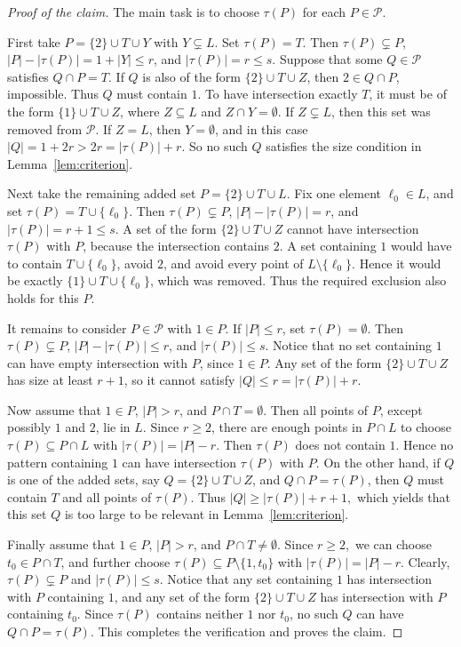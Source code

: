 \documentclass[11pt]{article}
\theoremstyle{definition}
\newenvironment{poc}{\begin{proof}[Proof of the claim]\renewcommand*{\qedsymbol}{$\blacksquare$}}{\end{proof}}
\newcommand{\cP}{\mathcal{P}}
\begin{document}
\begin{poc}
The main task is to choose \(\tau(P)\) for each \(P\in\cP\).

First take \(P=\{2\}\cup T\cup Y\) with \(Y\subsetneq L\). Set \(\tau(P)=T\). Then \(\tau(P)\subsetneq P\), \(|P|-|\tau(P)|=1+|Y|\le r\), and \(|\tau(P)|=r\le s\). Suppose that some \(Q\in\cP\) satisfies \(Q\cap P=T\). If \(Q\) is also of the form \(\{2\}\cup T\cup Z\), then \(2\in Q\cap P\), impossible. Thus \(Q\) must contain \(1\). To have intersection exactly \(T\), it must be of the form \(\{1\}\cup T\cup Z\), where \(Z\subseteq L\) and \(Z\cap Y=\emptyset\). If \(Z\subsetneq L\), then this set was removed from \(\cP\). If \(Z=L\), then \(Y=\emptyset\), and in this case \(|Q|=1+2r>2r=|\tau(P)|+r.\)
So no such \(Q\) satisfies the size condition in Lemma~\ref{lem:criterion}.

Next take the remaining added set \(P=\{2\}\cup T\cup L\). Fix one element \(\ell_0\in L\), and set \(\tau(P)=T\cup\{\ell_0\}\). Then \(\tau(P)\subsetneq P\), \(|P|-|\tau(P)|=r\), and \(|\tau(P)|=r+1\le s\). A set of the form \(\{2\}\cup T\cup Z\) cannot have intersection \(\tau(P)\) with \(P\), because the intersection contains \(2\). A set containing \(1\) would have to contain \(T\cup\{\ell_0\}\), avoid \(2\), and avoid every point of \(L\setminus\{\ell_0\}\). Hence it would be exactly \(\{1\}\cup T\cup\{\ell_0\}\), which was removed. Thus the required exclusion also holds for this \(P\).

It remains to consider \(P\in\cP\) with \(1\in P\). If \(|P|\le r\), set \(\tau(P)=\emptyset\). Then \(\tau(P)\subsetneq P\), \(|P|-|\tau(P)|\le r\), and \(|\tau(P)|\le s\). Notice that no set containing \(1\) can have empty intersection with \(P\), since \(1\in P\). Any set of the form \(\{2\}\cup T\cup Z\) has size at least \(r+1\), so it cannot satisfy \(|Q|\le r=|\tau(P)|+r\).

Now assume that \(1\in P\), \(|P|>r\), and \(P\cap T=\emptyset\). Then all points of \(P\), except possibly \(1\) and \(2\), lie in \(L\). Since \(r\ge2\), there are enough points in \(P\cap L\) to choose
\(\tau(P)\subseteq P\cap L\) with \(|\tau(P)|=|P|-r.\)
Then \(\tau(P)\) does not contain \(1\). Hence no pattern containing \(1\) can have intersection \(\tau(P)\) with \(P\). On the other hand, if \(Q\) is one of the added sets, say \(Q=\{2\}\cup T\cup Z\), and \(Q\cap P=\tau(P)\), then \(Q\) must contain \(T\) and all points of \(\tau(P)\). Thus \(|Q|\ge |\tau(P)|+r+1,\)
which yields that this set \(Q\) is too large to be relevant in Lemma~\ref{lem:criterion}.

Finally assume that \(1\in P\), \(|P|>r\), and \(P\cap T\ne\emptyset\). Since \(r\ge 2,\) we can choose \(t_0\in P\cap T\), and further choose \(\tau(P)\subseteq P\setminus\{1,t_0\}\) with \(|\tau(P)|=|P|-r.\) Clearly, \(\tau(P)\subsetneq P\) and \(|\tau(P)|\le s\). Notice that any set containing \(1\) has intersection with \(P\) containing \(1\), and any set of the form \(\{2\}\cup T\cup Z\) has intersection with \(P\) containing \(t_0\). Since \(\tau(P)\) contains neither \(1\) nor \(t_0\), no such \(Q\) can have \(Q\cap P=\tau(P)\). This completes the verification and proves the claim.
\end{poc}
\end{document}
